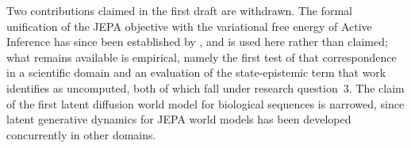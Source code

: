 \documentclass[12pt, a4paper]{article}
\begin{document}
\noindent Two contributions claimed in the first draft are withdrawn. The formal unification of the JEPA objective with the variational free energy of Active Inference has since been established by \citet{arnez2026sigregfree}, and is used here rather than claimed; what remains available is empirical, namely the first test of that correspondence in a scientific domain and an evaluation of the state-epistemic term that work identifies as uncomputed, both of which fall under research question~3. The claim of the first latent diffusion world model for biological sequences is narrowed, since latent generative dynamics for JEPA world models has been developed concurrently in other domains.


\newpage

\end{document}
